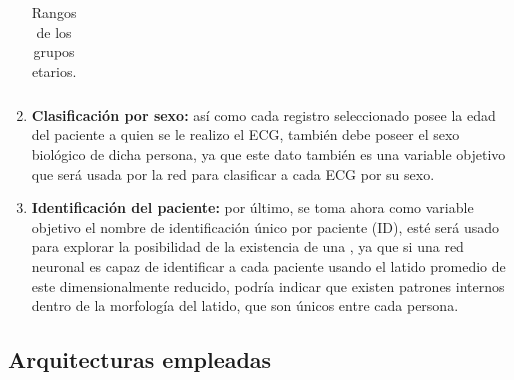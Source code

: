 \documentclass[12pt,letterpaper,oneside,openright]{book}
\begin{document}
\begin{enumerate}
\begin{table}[h]
\begin{center}
\begin{tabular}{| M{3cm} | M{2cm} |}
			\end{tabular}
		\caption{Rangos de los grupos etarios.}
		\label{tab:grupos_etarios}
		\end{center}
	\end{table}
	\item \textbf{Clasificación por sexo:} así como cada registro seleccionado posee la edad del paciente a quien se le realizo el ECG, también debe poseer el sexo biológico de dicha persona, ya que este dato también es una variable objetivo que será usada por la red para clasificar a cada ECG por su sexo.
	\item \textbf{Identificación del paciente:} por último, se toma ahora como variable objetivo el nombre de identificación único por paciente (ID), esté será usado para explorar la posibilidad de la existencia de una , ya que si una red neuronal es capaz de identificar a cada paciente usando el latido promedio de este dimensionalmente reducido, podría indicar que existen patrones internos dentro de la morfología del latido, que son únicos entre cada persona.
\end{enumerate}

\subsection{Arquitecturas empleadas}
\end{document}
